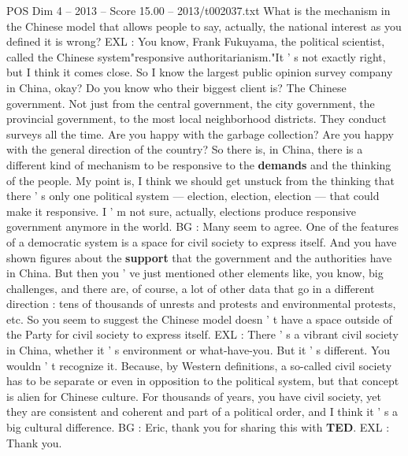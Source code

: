 \begin{textsample}{POS Dim 4 – 2013 – Score 15.00 – 2013/t002037.txt}
What is the mechanism in the Chinese model that allows people to say, actually, the national interest as you defined it is wrong?
EXL : You know, Frank Fukuyama, the political scientist, called the Chinese system"responsive authoritarianism."It ' s not exactly right, but I think it comes close.
So I know the largest public opinion survey company in China, okay?
Do you know who their biggest client is?
The Chinese government.
Not just from the central government, the city government, the provincial government, to the most local neighborhood districts.
They conduct surveys all the time.
Are you happy with the garbage collection?
Are you happy with the general direction of the country?
So there is, in China, there is a different kind of mechanism to be responsive to the \textbf{demands} and the thinking of the people.
My point is, I think we should get unstuck from the thinking that there ' s only one political system — election, election, election — that could make it responsive.
I ' m not sure, actually, elections produce responsive government anymore in the world.
BG : Many seem to agree.
One of the features of a democratic system is a space for civil society to express itself.
And you have shown figures about the \textbf{support} that the government and the authorities have in China.
But then you ' ve just mentioned other elements like, you know, big challenges, and there are, of course, a lot of other data that go in a different direction : tens of thousands of unrests and protests and environmental protests, etc.
So you seem to suggest the Chinese model doesn ' t have a space outside of the Party for civil society to express itself.
EXL : There ' s a vibrant civil society in China, whether it ' s environment or what-have-you.
But it ' s different.
You wouldn ' t recognize it.
Because, by Western definitions, a so-called civil society has to be separate or even in opposition to the political system, but that concept is alien for Chinese culture.
For thousands of years, you have civil society, yet they are consistent and coherent and part of a political order, and I think it ' s a big cultural difference.
BG : Eric, thank you for sharing this with \textbf{TED}.
EXL : Thank you.

\end{textsample}
